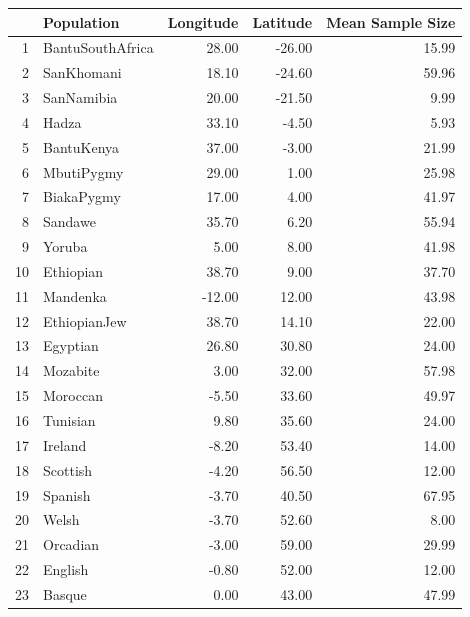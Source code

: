 \documentclass[10pt,letterpaper]{article}
\begin{document}
 
 \begin{table}[ht]
 \tiny
\centering
\begin{tabular}{rlrrr}
  \hline
 & Population & Longitude & Latitude & Mean Sample Size \\ 
  \hline
1 & \textcolor{BantuSouthAfrica}{BantuSouthAfrica} & 28.00 & -26.00 & 15.99 \\ 
  2 & \textcolor{SanKhomani}{SanKhomani} & 18.10 & -24.60 & 59.96 \\ 
  3 & \textcolor{SanNamibia}{SanNamibia} & 20.00 & -21.50 & 9.99 \\ 
  4 & \textcolor{Hadza}{Hadza} & 33.10 & -4.50 & 5.93 \\ 
  5 & \textcolor{BantuKenya}{BantuKenya} & 37.00 & -3.00 & 21.99 \\ 
  6 & \textcolor{MbutiPygmy}{MbutiPygmy} & 29.00 & 1.00 & 25.98 \\ 
  7 & \textcolor{BiakaPygmy}{BiakaPygmy} & 17.00 & 4.00 & 41.97 \\ 
  8 & \textcolor{Sandawe}{Sandawe} & 35.70 & 6.20 & 55.94 \\ 
  9 & \textcolor{Yoruba}{Yoruba} & 5.00 & 8.00 & 41.98 \\ 
  10 & \textcolor{Ethiopian}{Ethiopian} & 38.70 & 9.00 & 37.70 \\ 
  11 & \textcolor{Mandenka}{Mandenka} & -12.00 & 12.00 & 43.98 \\ 
  12 & \textcolor{EthiopianJew}{EthiopianJew} & 38.70 & 14.10 & 22.00 \\ 
  13 & \textcolor{Egyptian}{Egyptian} & 26.80 & 30.80 & 24.00 \\ 
  14 & \textcolor{Mozabite}{Mozabite} & 3.00 & 32.00 & 57.98 \\ 
  15 & \textcolor{Moroccan}{Moroccan} & -5.50 & 33.60 & 49.97 \\ 
  16 & \textcolor{Tunisian}{Tunisian} & 9.80 & 35.60 & 24.00 \\ 
  17 & \textcolor{Ireland}{Ireland} & -8.20 & 53.40 & 14.00 \\ 
  18 & \textcolor{Scottish}{Scottish} & -4.20 & 56.50 & 12.00 \\ 
  19 & \textcolor{Spanish}{Spanish} & -3.70 & 40.50 & 67.95 \\ 
  20 & \textcolor{Welsh}{Welsh} & -3.70 & 52.60 & 8.00 \\ 
  21 & \textcolor{Orcadian}{Orcadian} & -3.00 & 59.00 & 29.99 \\ 
  22 & \textcolor{English}{English} & -0.80 & 52.00 & 12.00 \\ 
  23 & \textcolor{Basque}{Basque} & 0.00 & 43.00 & 47.99 \\ 

\end{tabular}
\end{table}
\end{document}
